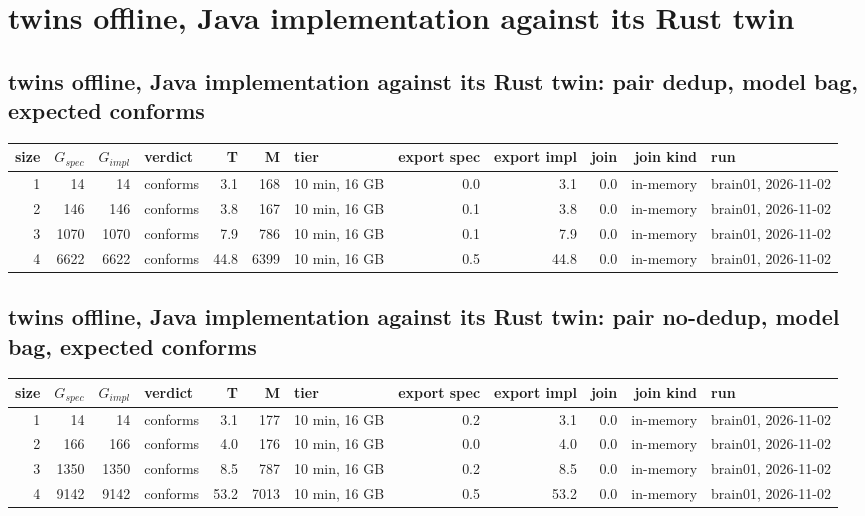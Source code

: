 \documentclass[10pt]{article}
\begin{document}
\section*{twins offline, Java implementation against its Rust twin}
\subsection*{twins offline, Java implementation against its Rust twin: pair \textsf{dedup}, model bag, expected conforms}
\begin{longtable}{@{}rrrlrrlrrrrl@{}}
\toprule
size & $G_{\mathit{spec}}$ & $G_{\mathit{impl}}$ & verdict & T & M & tier & export spec & export impl & join & join kind & run \\
\midrule
\endhead
\color{red} 1 & 14 & 14 & conforms & 3.1 & 168 & 10 min, 16 GB & 0.0 & 3.1 & 0.0 & in-memory & brain01, 2026-11-02 \\
\color{red} 2 & 146 & 146 & conforms & 3.8 & 167 & 10 min, 16 GB & 0.1 & 3.8 & 0.0 & in-memory & brain01, 2026-11-02 \\
\color{red} 3 & 1070 & 1070 & conforms & 7.9 & 786 & 10 min, 16 GB & 0.1 & 7.9 & 0.0 & in-memory & brain01, 2026-11-02 \\
\color{red} 4 & 6622 & 6622 & conforms & 44.8 & 6399 & 10 min, 16 GB & 0.5 & 44.8 & 0.0 & in-memory & brain01, 2026-11-02 \\
\bottomrule
\end{longtable}
\subsection*{twins offline, Java implementation against its Rust twin: pair \textsf{no-dedup}, model bag, expected conforms}
\begin{longtable}{@{}rrrlrrlrrrrl@{}}
\toprule
size & $G_{\mathit{spec}}$ & $G_{\mathit{impl}}$ & verdict & T & M & tier & export spec & export impl & join & join kind & run \\
\midrule
\endhead
\color{red} 1 & 14 & 14 & conforms & 3.1 & 177 & 10 min, 16 GB & 0.2 & 3.1 & 0.0 & in-memory & brain01, 2026-11-02 \\
\color{red} 2 & 166 & 166 & conforms & 4.0 & 176 & 10 min, 16 GB & 0.0 & 4.0 & 0.0 & in-memory & brain01, 2026-11-02 \\
\color{red} 3 & 1350 & 1350 & conforms & 8.5 & 787 & 10 min, 16 GB & 0.2 & 8.5 & 0.0 & in-memory & brain01, 2026-11-02 \\
\color{red} 4 & 9142 & 9142 & conforms & 53.2 & 7013 & 10 min, 16 GB & 0.5 & 53.2 & 0.0 & in-memory & brain01, 2026-11-02 \\
\bottomrule
\end{longtable}
\end{document}

